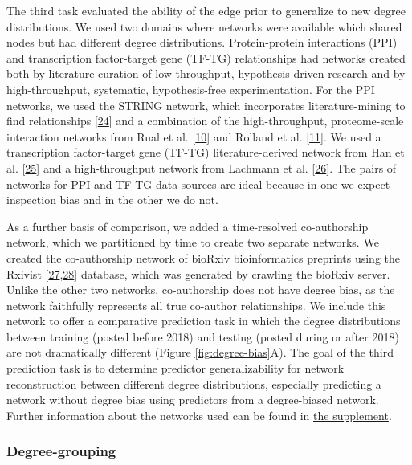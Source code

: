 The third task evaluated the ability of the edge prior to generalize to new degree distributions.
We used two domains where networks were available which shared nodes but had different degree distributions.
Protein-protein interactions (PPI) and transcription factor-target gene (TF-TG) relationships had networks created both by literature curation of low-throughput, hypothesis-driven research and by high-throughput, systematic, hypothesis-free experimentation.
For the PPI networks, we used the STRING network, which incorporates literature-mining to find relationships {[}\protect\hyperlink{ref-fkKIuC7X}{24}{]} and a combination of the high-throughput, proteome-scale interaction networks from Rual et al. {[}\protect\hyperlink{ref-lnDqu0oW}{10}{]} and Rolland et al. {[}\protect\hyperlink{ref-LCyCrr7W}{11}{]}.
We used a transcription factor-target gene (TF-TG) literature-derived network from Han et al. {[}\protect\hyperlink{ref-z5ieI0Qg}{25}{]} and a high-throughput network from Lachmann et al. {[}\protect\hyperlink{ref-13Jzku9hE}{26}{]}.
The pairs of networks for PPI and TF-TG data sources are ideal because in one we expect inspection bias and in the other we do not.

As a further basis of comparison, we added a time-resolved co-authorship network, which we partitioned by time to create two separate networks.
We created the co-authorship network of bioRxiv bioinformatics preprints using the Rxivist {[}\protect\hyperlink{ref-iPnRRJya}{27},\protect\hyperlink{ref-7668E40A}{28}{]} database, which was generated by crawling the bioRxiv server.
Unlike the other two networks, co-authorship does not have degree bias, as the network faithfully represents all true co-author relationships.
We include this network to offer a comparative prediction task in which the degree distributions between training (posted before 2018) and testing (posted during or after 2018) are not dramatically different (Figure \ref{fig:degree-bias}A).
The goal of the third prediction task is to determine predictor generalizability for network reconstruction between different degree distributions, especially predicting a network without degree bias using predictors from a degree-biased network.
Further information about the networks used can be found in \protect\hyperlink{networks}{the supplement}.

\hypertarget{degree-grouping}{%
\subsubsection{Degree-grouping}\label{degree-grouping}}

